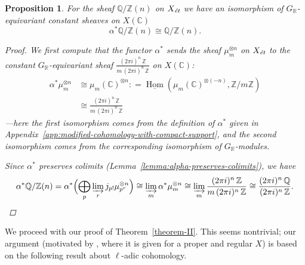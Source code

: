 \documentclass[leqno,12pt]{article}
\theoremstyle{plain}
\newtheorem{proposition}[theorem]{\indent\sc Proposition}
\theoremstyle{definition}
\DeclareMathOperator{\Hom}{Hom}
\newcommand{\CC}{\mathbb{C}}
\newcommand{\QQ}{\mathbb{Q}}
\newcommand{\RR}{\mathbb{R}}
\newcommand{\ZZ}{\mathbb{Z}}
\newcommand{\dfn}{\mathrel{\mathop:}=}
\newcommand{\et}{\text{\it \'{e}t}}
\newcommand{\iHom}{\underline{\Hom}}
\begin{document}
\begin{proposition}
  \label{propn:image-of-Q/Zn-under-alpha}
  For the sheaf $\QQ/\ZZ (n)$ on $X_\et$ we have an isomorphism of
  $G_\RR$-equivariant constant sheaves on $X (\CC)$
  $$\alpha^* \QQ/\ZZ (n) \cong \QQ/\ZZ (n).$$

  \begin{proof}
    We first compute that the functor $\alpha^*$ sends the sheaf
    $\mu_m^{\otimes n}$ on $X_\et$ to the constant $G_\RR$-equivariant sheaf
    $\frac{(2\pi i)^n\,\ZZ}{m\,(2\pi i)^n\,\ZZ}$ on $X(\CC)$:
    \begin{align*}
      \alpha^* \mu_m^{\otimes n} & \cong \mu_m (\CC)^{\otimes n} \dfn \iHom (\mu_m (\CC)^{\otimes (-n)}, \ZZ/m\ZZ) \\
                                 & \cong \frac{(2\pi i)^n\,\ZZ}{m\,(2\pi i)^n\,\ZZ}
    \end{align*}
    ---here the first isomorphism comes from the definition of $\alpha^*$ given
    in Appendix~\ref{app:modified-cohomology-with-compact-support}, and the
    second isomorphism comes from the corresponding isomorphism of
    $G_\RR$-modules.

    Since $\alpha^*$ preserves colimits
    (Lemma~\ref{lemma:alpha-preserves-colimits}), we have
    \[
      \alpha^* \QQ/\ZZ (n)
      = \alpha^* \Bigl(\bigoplus_p \varinjlim_r j_{p!} \mu_{p^r}^{\otimes n}\Bigr)
      \cong \varinjlim_m \alpha^* \mu_m^{\otimes n}
      \cong \varinjlim_m \frac{(2\pi i)^n\,\ZZ}{m\,(2\pi i)^n\,\ZZ}
      \cong \frac{(2\pi i)^n\,\QQ}{(2\pi i)^n\,\ZZ}.
      \qedhere
    \]
  \end{proof}
\end{proposition}

We proceed with our proof of Theorem~\ref{theorem-II}. This seems nontrivial;
our argument (motivated by \cite{Flach-Morin-2018}, where it is given for a
proper and regular $X$) is based on the following result about $\ell$-adic
cohomology.
\end{document}
